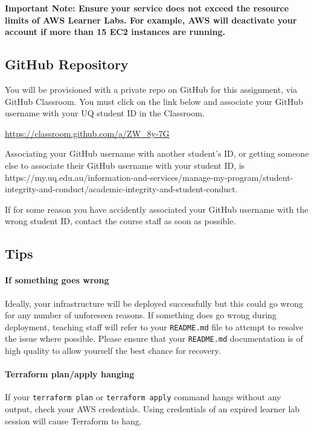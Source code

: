 \documentclass{csse4400}
\begin{document}
\textbf{Important Note: 
Ensure your service does not exceed the resource limits of AWS Learner Labs.
For example, AWS will deactivate your account if more than 15 EC2 instances are running.}

\subsection{GitHub Repository}\label{sec:github}
You will be provisioned with a private repo on GitHub for this assignment, via GitHub Classroom.
You must click on the link below and associate your GitHub username with your UQ student ID in the Classroom.

\url{https://classroom.github.com/a/ZW_8y-7G}

\noindent
Associating your GitHub username with another student's ID,
or getting someone else to associate their GitHub username with your student ID, is 
{https://my.uq.edu.au/information-and-services/manage-my-program/student-integrity-and-conduct/academic-integrity-and-student-conduct}.

If for some reason you have accidently associated your GitHub username with the wrong student ID,
contact the course staff as soon as possible.

\subsection{Tips}

\paragraph{If something goes wrong}
Ideally, your infrastructure will be deployed successfully but this could go wrong for any number of unforeseen reasons.
If something does go wrong during deployment,
teaching staff will refer to your \texttt{README.md} file to attempt to resolve the issue where possible.
Please ensure that your \texttt{README.md} documentation is of high quality to allow yourself the best chance for recovery.

\paragraph{Terraform plan/apply hanging}
If your \texttt{terraform plan} or \texttt{terraform apply} command hangs without any output,
check your AWS credentials.
Using credentials of an expired learner lab session will cause Terraform to hang.
\end{document}
